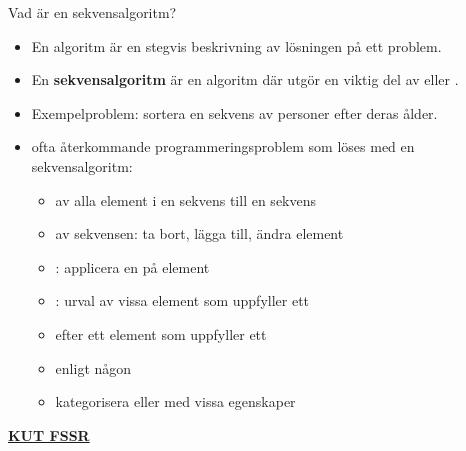 


\begin{Slide}{Vad är en sekvensalgoritm?}\SlideFontTiny
\begin{itemize}
\item En algoritm är en stegvis beskrivning av lösningen på ett problem.
\item En \textbf{sekvensalgoritm} är en algoritm där  utgör en viktig del av  eller .
\item Exempelproblem: sortera en sekvens av personer efter deras ålder.
\pause
\item {} ofta återkommande programmeringsproblem som löses med en sekvensalgoritm:
\begin{itemize}\SlideFontTiny
\item {} av alla element i en sekvens till en  sekvens
\item {} av sekvensen: ta bort, lägga till, ändra  element
\item {}: applicera en  på  element   
\item {}: urval av vissa element som uppfyller ett 
\item {} efter ett element som uppfyller ett 
\item {} enligt någon 
\item {} kategorisera eller  med vissa egenskaper
\end{itemize}
\end{itemize}
\href{https://youtu.be/0ArlUSVDQIw?t=27s}{\textbf{KUT FSSR}} 
\end{Slide}

\ifkompendium\else
{
  \frame[plain]{\centering\Huge\textbf{\color{pink}{ORDNINGEN\\SPELAR\\ROLL}\\\color{red}{KUT FSSR}}}
}
\fi





